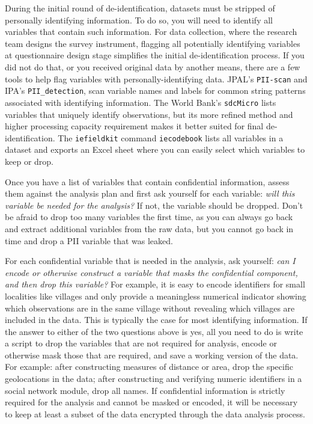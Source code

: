 During the initial round of de-identification,
datasets must be stripped of personally identifying information.
To do so, you will need to identify all variables that contain such information.
For data collection, where the research team designs the survey instrument,
flagging all potentially identifying variables at questionnaire design stage
simplifies the initial de-identification process.
If you did not do that, or you received original data by another means,
there are a few tools to help flag variables with personally-identifying data.
JPAL's \texttt{PII-scan} and
IPA's \texttt{PII\_detection},
scan variable names and labels for common string patterns
associated with identifying information.
The World Bank's \texttt{sdcMicro}
lists variables that uniquely identify observations,
but its more refined method and
higher processing capacity requirement makes it
better suited for final de-identification.
The \texttt{iefieldkit} command \texttt{iecodebook}
lists all variables in a dataset and exports an Excel sheet
where you can easily select which variables to keep or drop.

Once you have a list of variables that contain confidential information,
assess them against the analysis plan and first ask yourself for each variable:
\textit{will this variable be needed for the analysis?}
If not, the variable should be dropped.
Don't be afraid to drop too many variables the first time,
as you can always go back and extract additional variables from the raw data,
but you cannot go back in time and drop a PII variable that was leaked.

For each confidential variable that is needed in the analysis, ask yourself:
\textit{can I encode or otherwise construct a variable that masks the confidential component, and
	then drop this variable?}
For example, it is easy to encode identifiers for small localities like villages
and only provide a meaningless numerical indicator
showing which observations are in the same village
without revealing which villages are included in the data.
This is typically the case for most identifying information.
If the answer to either of the two questions above is yes,
all you need to do is write a script to drop the variables that are not required for analysis,
encode or otherwise mask those that are required,
and save a working version of the data.
For example:
after constructing measures of distance or area,
drop the specific geolocations in the data;
after constructing and verifying numeric identifiers in
a social network module, drop all names.
If confidential information is strictly required for the analysis and cannot be
masked or encoded,
it will be necessary to keep at least a subset of the data encrypted through
the data analysis process.

